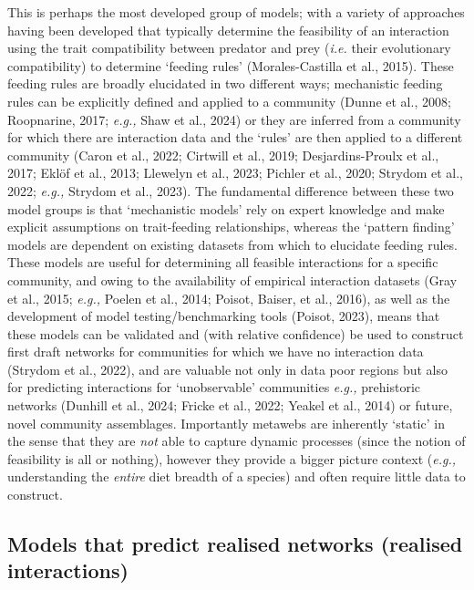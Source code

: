 \documentclass[
]{article}
\begin{document}
This is perhaps the most developed group of models; with a variety of
approaches having been developed that typically determine the
feasibility of an interaction using the trait compatibility between
predator and prey (\emph{i.e.} their evolutionary compatibility) to
determine `feeding rules' (Morales-Castilla et al., 2015). These feeding
rules are broadly elucidated in two different ways; mechanistic feeding
rules can be explicitly defined and applied to a community (Dunne et
al., 2008; Roopnarine, 2017; \emph{e.g.,} Shaw et al., 2024) or they are
inferred from a community for which there are interaction data and the
`rules' are then applied to a different community (Caron et al., 2022;
Cirtwill et al., 2019; Desjardins-Proulx et al., 2017; Eklöf et al.,
2013; Llewelyn et al., 2023; Pichler et al., 2020; Strydom et al., 2022;
\emph{e.g.,} Strydom et al., 2023). The fundamental difference between
these two model groups is that `mechanistic models' rely on expert
knowledge and make explicit assumptions on trait-feeding relationships,
whereas the `pattern finding' models are dependent on existing datasets
from which to elucidate feeding rules. These models are useful for
determining all feasible interactions for a specific community, and
owing to the availability of empirical interaction datasets (Gray et
al., 2015; \emph{e.g.,} Poelen et al., 2014; Poisot, Baiser, et al.,
2016), as well as the development of model testing/benchmarking tools
(Poisot, 2023), means that these models can be validated and (with
relative confidence) be used to construct first draft networks for
communities for which we have no interaction data (Strydom et al.,
2022), and are valuable not only in data poor regions but also for
predicting interactions for `unobservable' communities \emph{e.g.,}
prehistoric networks (Dunhill et al., 2024; Fricke et al., 2022; Yeakel
et al., 2014) or future, novel community assemblages. Importantly
metawebs are inherently `static' in the sense that they are \emph{not}
able to capture dynamic processes (since the notion of feasibility is
all or nothing), however they provide a bigger picture context
(\emph{e.g.,} understanding the \emph{entire} diet breadth of a species)
and often require little data to construct.

\subsection{Models that predict realised networks (realised
interactions)}\label{models-that-predict-realised-networks-realised-interactions}
\end{document}
